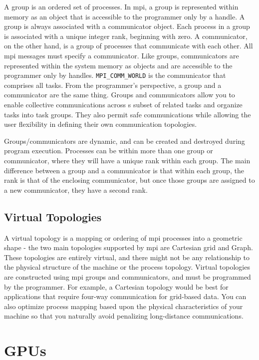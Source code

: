 \documentclass[10pt]{article}
\begin{document}
\begin{flushleft}
A group is an ordered set of processes. In \gls{mpi}, a group is represented within memory as an object that is accessible to the programmer only by a handle. A group is always associated with a communicator object. Each process in a group is associated with a unique integer rank, beginning with zero. A communicator, on the other hand, is a group of processes that communicate with each other. All \gls{mpi} messages must specify a communicator. Like groups, communicators are represented within the system memory as objects and are accessible to the programmer only by handles. {\tt MPI\_COMM\_WORLD} is the communicator that comprises all tasks. From the programmer's perspective, a group and a communicator are the same thing. Groups and communicators allow you to enable collective communications across s subset of related tasks and organize tasks into task groups. They also permit safe communications while allowing the user flexibility in defining their own communication topologies. 

Groups/communicators are dynamic, and can be created and destroyed during program execution. Processes can be within more than one group or communicator, where they will have a unique rank within each group. The main difference between a group and a communicator is that within each group, the rank is that of the enclosing communicator, but once those groups are assigned to a new communicator, they have a second rank. 

\subsection{Virtual Topologies}

A virtual topology is a mapping or ordering of \gls{mpi} processes into a geometric shape - the two main topologies supported by \gls{mpi} are Cartesian grid and Graph. These topologies are entirely virtual, and there might not be any relationship to the physical structure of the machine or the process topology. Virtual topologies are constructed using \gls{mpi} groups and communicators, and must be programmed by the programmer. For example, a Cartesian topology would be best for applications that require four-way communication for grid-based data. You can also optimize process mapping based upon the physical characteristics of your machine so that you naturally avoid penalizing long-distance communications. 



\section{GPUs}


\end{flushleft}
\end{document}
